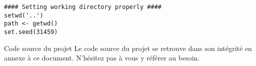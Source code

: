 \begin{lstlisting}[caption = Environnement de travail,label=src:WDsettings]
#### Setting working directory properly ####
setwd('..')
path <- getwd()
set.seed(31459)
\end{lstlisting} 

\begin{moreInfo}{Code source du projet}
	Le code source du projet se retrouve dans son intégrité en annexe à ce document. N'hésitez pas à vous y référer au besoin.
\end{moreInfo}
